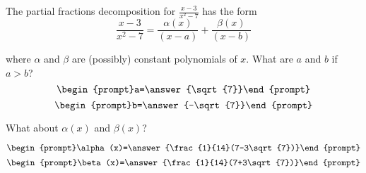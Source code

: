 \documentclass{ximera}
\author{Gregory Hartman \and Matthew Carr}
\begin{document}
\begin{exercise}




The partial fractions decomposition for $\frac{x-3}{x^2-7}$ has the form 
\[
\frac{x-3}{x^2-7}=\frac{\alpha(x)}{(x-a)}+\frac{\beta(x)}{(x-b)}
\]

where $\alpha$ and $\beta$ are (possibly) constant polynomials of $x$. What are $a$ and $b$ if $a>b$?
\[
\begin{prompt}a=\answer{\sqrt{7}}\end{prompt}
\]
\[
\begin{prompt}b=\answer{-\sqrt{7}}\end{prompt}
\]

What about $\alpha(x)$ and $\beta(x)$? 

\[
\begin{prompt}\alpha(x)=\answer{\frac{1}{14}(7-3\sqrt{7})}\end{prompt}
\]
\[
\begin{prompt}\beta(x)=\answer{\frac{1}{14}(7+3\sqrt{7})}\end{prompt}
\]


\end{exercise}
\end{document}

